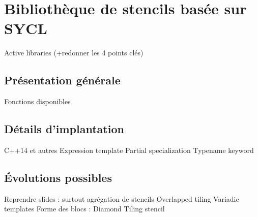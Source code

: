 
\chapter{Bibliothèque de stencils basée sur SYCL}

Active libraries \cite{Art20} (+redonner les 4 points clés)

\section{Présentation générale}

Fonctions disponibles

\section{Détails d'implantation}

C++14 et autres
Expression template \cite{Web4,Art21}
Partial specialization \cite{Web1}
Typename keyword \cite{Web2}

\section{\'Evolutions possibles}

Reprendre slides : surtout agrégation de stencils
Overlapped tiling \cite{Art17}
Variadic templates \cite{Art6}
Forme des blocs : Diamond Tiling stencil \cite{Art16}


